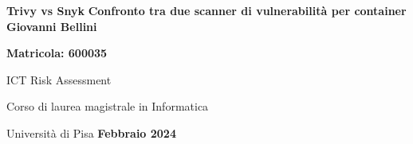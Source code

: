 \documentclass[12pt]{report}
\begin{document}
\begin{center}
   \vspace*{1cm}
   \Huge
   \textbf{Trivy vs Snyk}
   \vspace{0.5cm}
   \Large
   \vfill
   \textbf{Confronto tra due scanner di vulnerabilità per container}
   \vspace{1.5cm}
   \large
   \vfill
   \textbf{Giovanni Bellini}

   \textbf{Matricola: 600035}

   ICT Risk Assessment

      {Corso di laurea magistrale in Informatica}

      {Università di Pisa}
   \vfill
   \Large
   \textbf{Febbraio 2024}
\end{center}

\pagebreak
\tableofcontents




\printbibliography
\end{document}

